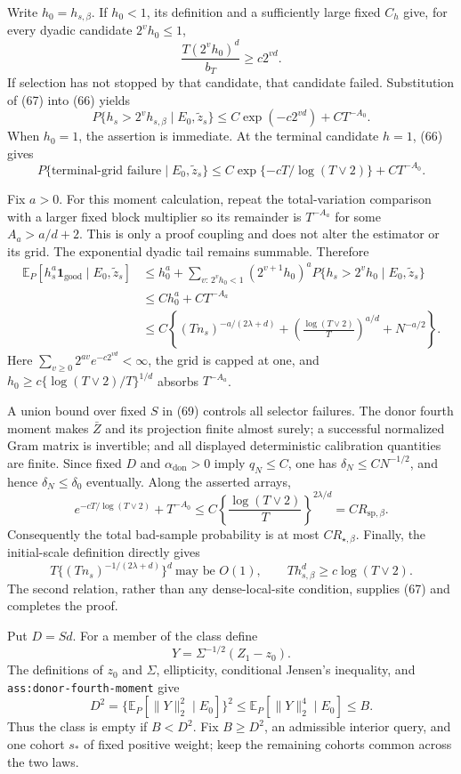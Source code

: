 Write \(h_0=h_{s,\beta}\).  If \(h_0<1\), its definition and a sufficiently large fixed \(C_h\) give, for every dyadic candidate \(2^vh_0\leq1\),
\[
\frac{T(2^vh_0)^d}{b_T}\geq c2^{vd}.
\tag{67}
\]
If selection has not stopped by that candidate, that candidate failed.  Substitution of (67) into (66) yields
\[
P\{h_s>2^vh_{s,\beta}\mid E_0,\widetilde z_s\}
\leq C\exp(-c2^{vd})+CT^{-A_0}.
\tag{68}
\]
When \(h_0=1\), the assertion is immediate.  At the terminal candidate \(h=1\), (66) gives
\[
P\{\text{terminal-grid failure}\mid E_0,\widetilde z_s\}
\leq C\exp\{-cT/\log(T\vee2)\}+CT^{-A_0}.
\tag{69}
\]

Fix \(a>0\).  For this moment calculation, repeat the total-variation comparison with a larger fixed block multiplier so its remainder is \(T^{-A_a}\) for some \(A_a>a/d+2\).  This is only a proof coupling and does not alter the estimator or its grid.  The exponential dyadic tail remains summable.  Therefore
\[
\begin{aligned}
\mathbb E_P[h_s^a\mathbf1_{\mathrm{good}}\mid E_0,\widetilde z_s]
&\leq h_0^a+
\sum_{v:\,2^vh_0<1}(2^{v+1}h_0)^a
P\{h_s>2^vh_0\mid E_0,\widetilde z_s\}\\
&\leq Ch_0^a+CT^{-A_a}\\
&\leq C\left\{(Tn_s)^{-a/(2\lambda+d)}
+\left(\frac{\log(T\vee2)}T\right)^{a/d}
+N^{-a/2}\right\}.
\end{aligned}
\tag{70}
\]
Here \(\sum_{v\geq0}2^{av}e^{-c2^{vd}}<\infty\), the grid is capped at one, and \(h_0\geq c\{\log(T\vee2)/T\}^{1/d}\) absorbs \(T^{-A_a}\).

A union bound over fixed \(S\) in (69) controls all selector failures.  The donor fourth moment makes \(\bar Z\) and its projection finite almost surely; a successful normalized Gram matrix is invertible; and all displayed deterministic calibration quantities are finite.  Since fixed \(D\) and \(\alpha_{\mathrm{don}}>0\) imply \(q_N\leq C\), one has \(\delta_N\leq CN^{-1/2}\), and hence \(\delta_N\leq\delta_0\) eventually.  Along the asserted arrays,
\[
e^{-cT/\log(T\vee2)}+T^{-A_0}
\leq C\left\{\frac{\log(T\vee2)}T\right\}^{2\lambda/d}
=CR_{\mathrm{sp},\beta}.
\tag{71}
\]
Consequently the total bad-sample probability is at most \(CR_{\star,\beta}\).  Finally, the initial-scale definition directly gives
\[
T\{(Tn_s)^{-1/(2\lambda+d)}\}^d\ \text{may be }O(1),
\qquad
Th_{s,\beta}^d\geq c\log(T\vee2).
\tag{72}
\]
The second relation, rather than any dense-local-site condition, supplies (67) and completes the proof.

Put \(D=Sd\).  For a member of the class define
\[
Y=\Sigma^{-1/2}(Z_1-z_0).
\]
The definitions of \(z_0\) and \(\Sigma\), ellipticity, conditional Jensen's inequality, and \texttt{ass:donor-fourth-moment} give
\[
D^2
=\{\mathbb E_P[\|Y\|_2^2\mid E_0]\}^2
\leq\mathbb E_P[\|Y\|_2^4\mid E_0]
\leq B.
\tag{73}
\]
Thus the class is empty if \(B<D^2\).  Fix \(B\geq D^2\), an admissible interior query, and one cohort \(s_*\) of fixed positive weight; keep the remaining cohorts common across the two laws.

